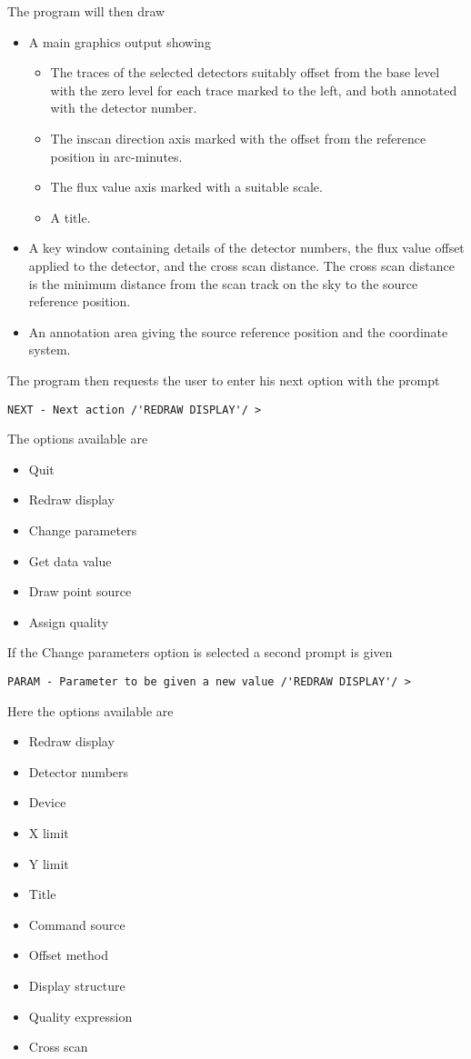 The program will then draw
\begin{itemize}
\item A main graphics output showing
\begin{itemize}
\item The traces of the selected detectors suitably offset from the base level
with the zero level for each trace marked to the left, and both annotated with 
the detector number.
\item The inscan direction axis marked with the offset from the reference 
position in arc-minutes.
\item The flux value axis marked with a suitable scale.
\item A title.
\end{itemize}
\item A key window containing details of the detector numbers, the flux value 
offset applied to the detector, and the cross scan distance. The cross scan 
distance is the minimum distance from the scan track on the sky to the source
reference position.
\item An annotation area giving the source reference position and the 
coordinate system.
\end{itemize}
The program then requests the user to enter his next option with the prompt
\begin{small}
\begin{verbatim}
NEXT - Next action /'REDRAW DISPLAY'/ > 
\end{verbatim}
\end{small}
The options available are
\begin{itemize}
\item Quit
\item Redraw display
\item Change parameters
\item Get data value
\item Draw point source
\item Assign quality
\end{itemize}
If the Change parameters option is selected a second prompt is given
\begin{small}
\begin{verbatim}
PARAM - Parameter to be given a new value /'REDRAW DISPLAY'/ > 
\end{verbatim}
\end{small}
Here the options available are
\begin{itemize}
\item Redraw display
\item Detector numbers
\item Device
\item X limit
\item Y limit
\item Title
\item Command source
\item Offset method
\item Display structure
\item Quality expression
\item Cross scan
\end{itemize}
